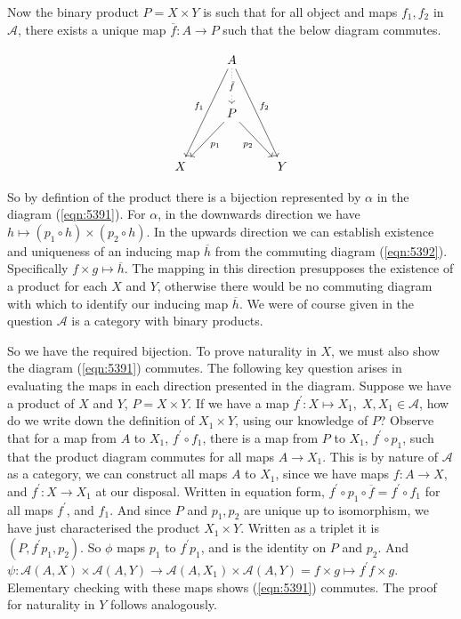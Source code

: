 \documentclass{article}
\begin{document}
Now the binary product $P = X \times Y$ is such that for all object and maps $f_1, f_2$ in $\mathcal{A}$, there exists a unique map $\overline{f} \colon A \rightarrow P$ such that the below diagram commutes.

\begin{equation}
  \label{eqn:5392}
  \begin{tikzcd}[row sep=1cm]
    &A\arrow[ddl,"f_1"']\arrow[ddr,"f_2"]\arrow[d,dotted,"\bar{f}" description]\\
    &P\arrow[dl,"p_1"]\arrow[dr,"p_2"']\\
    X&&Y
  \end{tikzcd}
\end{equation}

So by defintion of the product there is a bijection represented by $\alpha$ in the diagram (\ref{eqn:5391}). For $\alpha$, in the downwards direction we have $h \mapsto (p_1\circ h) \times (p_2 \circ h)$. In the upwards direction we can establish existence and uniqueness of an inducing map $\overline{h}$ from the commuting diagram (\ref{eqn:5392}). Specifically $f \times g \mapsto \overline{h}$. The mapping in this direction presupposes the existence of a product for each $X$ and $Y$, otherwise there would be no commuting diagram with which to identify our inducing map $\overline{h}$. We were of course given in the question $\mathcal{A}$ is a category with binary products.

So we have the required bijection. To prove naturality in $X$, we must also show the diagram (\ref{eqn:5391}) commutes. The following key question arises in evaluating the maps in each direction presented in the diagram. Suppose we have a product of $X$ and $Y$, $P = X \times Y$. If we have a map $f^\prime: X \mapsto X_1, \; X,X_1 \in \mathcal{A}$, how do we write down the definition of $X_1 \times Y$, using our knowledge of $P$? Observe that for a map from $A$ to $X_1$, $f^\prime \circ f_1$, there is a map from $P$ to $X_1$, $f^\prime \circ p_1$, such that the product diagram commutes for all maps $A \rightarrow X_1$. This is by nature of $\mathcal{A}$ as a category, we can construct all maps $A$ to $X_1$, since we have maps $f \colon A \rightarrow X$, and $f^\prime \colon X \rightarrow X_1$ at our disposal. Written in equation form, $f^\prime \circ p_1 \circ \overline{f} = f^\prime \circ f_1$ for all maps $f^\prime$, and $f_1$. And since $P$ and $p_1, p_2$ are unique up to isomorphism, we have just characterised the product $X_1 \times Y$. Written as a triplet it is $(P, f^\prime p_1, p_2)$. So $\phi$ maps $p_1$ to $f^\prime p_1$, and is the identity on $P$ and $p_2$. And $\psi\colon \mathcal{A}(A,X) \times \mathcal{A}(A,Y) \rightarrow \mathcal{A}(A,X_1) \times \mathcal{A}(A,Y) = f \times g \mapsto f^\prime f \times g$. Elementary checking with these maps shows (\ref{eqn:5391}) commutes. The proof for naturality in $Y$ follows analogously.
\end{document}
